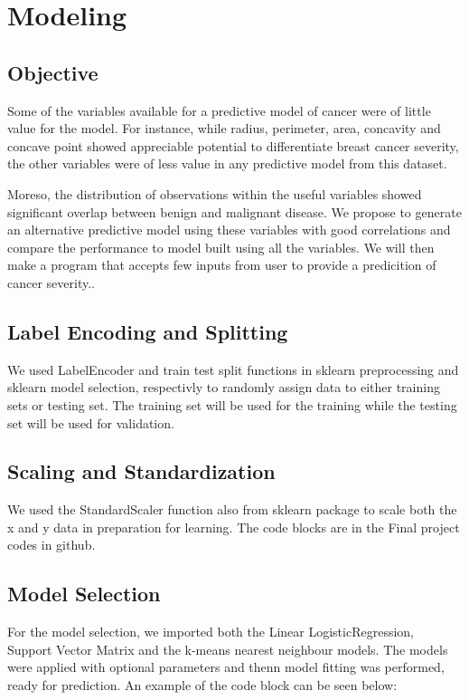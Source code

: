 \documentclass[conference]{IEEEtran}
\begin{document}
\section{Modeling}
\subsection{Objective}\label{AA}
Some of the variables available for a predictive model of cancer were of little value for the model. For instance, while radius, perimeter, area, concavity and concave point showed appreciable potential to differentiate breast cancer severity, the other variables were of less value in any predictive model from this dataset. 

Moreso, the distribution of observations within the useful variables showed significant overlap between benign and malignant disease. We propose to generate an alternative predictive model using these variables with good correlations and compare the performance to model built using all the variables. We will then make a program that accepts few inputs from user to provide a predicition of cancer severity..

\subsection{Label Encoding and Splitting}
We used LabelEncoder and train test split functions in sklearn preprocessing and sklearn model selection, respectivly to randomly assign data to either training sets or testing set. The training set will be used for the training while the testing set will be used for validation.

\subsection{Scaling and Standardization}
We used the StandardScaler function also from sklearn package to scale both the x and y data in preparation for learning. The code blocks are in the Final project codes in github.

\subsection{Model Selection}
For the model selection, we imported both the Linear LogisticRegression, Support Vector Matrix and the k-means nearest neighbour models. The models were applied with optional parameters and thenn model fitting was performed, ready for prediction. An example of the code block can be seen below:
 
\end{document}
